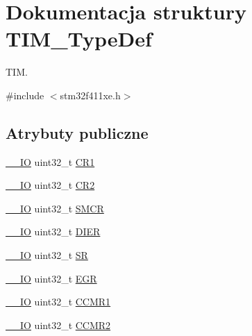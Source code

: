 \hypertarget{struct_t_i_m___type_def}{}\section{Dokumentacja struktury T\+I\+M\+\_\+\+Type\+Def}
\label{struct_t_i_m___type_def}


T\+IM.  




{\ttfamily \#include $<$stm32f411xe.\+h$>$}

\subsection*{Atrybuty publiczne}
\begin{DoxyCompactItemize}
\item 
\hyperlink{core__sc300_8h_aec43007d9998a0a0e01faede4133d6be}{\+\_\+\+\_\+\+IO} uint32\+\_\+t \hyperlink{struct_t_i_m___type_def_a9dafc8b03e8497203a8bb395db865328}{C\+R1}
\item 
\hyperlink{core__sc300_8h_aec43007d9998a0a0e01faede4133d6be}{\+\_\+\+\_\+\+IO} uint32\+\_\+t \hyperlink{struct_t_i_m___type_def_a6b1ae85138ed91686bf63699c61ef835}{C\+R2}
\item 
\hyperlink{core__sc300_8h_aec43007d9998a0a0e01faede4133d6be}{\+\_\+\+\_\+\+IO} uint32\+\_\+t \hyperlink{struct_t_i_m___type_def_a67d30593bcb68b98186ebe5bc8dc34b1}{S\+M\+CR}
\item 
\hyperlink{core__sc300_8h_aec43007d9998a0a0e01faede4133d6be}{\+\_\+\+\_\+\+IO} uint32\+\_\+t \hyperlink{struct_t_i_m___type_def_a22a33c78ca5bec0e3e8559164a82b8ef}{D\+I\+ER}
\item 
\hyperlink{core__sc300_8h_aec43007d9998a0a0e01faede4133d6be}{\+\_\+\+\_\+\+IO} uint32\+\_\+t \hyperlink{struct_t_i_m___type_def_acedfc978c879835c05ef1788ad26b2ff}{SR}
\item 
\hyperlink{core__sc300_8h_aec43007d9998a0a0e01faede4133d6be}{\+\_\+\+\_\+\+IO} uint32\+\_\+t \hyperlink{struct_t_i_m___type_def_a04248d87f48303fd2267810104a7878d}{E\+GR}
\item 
\hyperlink{core__sc300_8h_aec43007d9998a0a0e01faede4133d6be}{\+\_\+\+\_\+\+IO} uint32\+\_\+t \hyperlink{struct_t_i_m___type_def_a0f2291e7efdf3222689ef13e9be2ea4a}{C\+C\+M\+R1}
\item 
\hyperlink{core__sc300_8h_aec43007d9998a0a0e01faede4133d6be}{\+\_\+\+\_\+\+IO} uint32\+\_\+t \hyperlink{struct_t_i_m___type_def_aa8129ca70a2232c91c8cfcaf375249f6}{C\+C\+M\+R2}
\item 

\end{DoxyCompactItemize}
